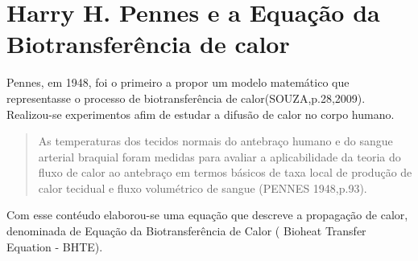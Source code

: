 \section{Harry H. Pennes e a Equação da Biotransferência de calor}


      
     Pennes, em 1948, foi o primeiro a propor um modelo matemático que representasse o processo de biotransferência de calor(SOUZA,p.28,2009).
     Realizou-se experimentos afim de estudar a difusão de calor no corpo humano.
      
      \begin{quotation}
      As temperaturas dos tecidos normais do antebraço humano e do sangue arterial braquial foram medidas para avaliar a aplicabilidade da teoria do fluxo de calor ao antebraço em termos básicos de taxa local de produção de calor tecidual e fluxo volumétrico de sangue (PENNES 1948,p.93). \end{quotation}

   Com esse contéudo elaborou-se uma equação que descreve a propagação de calor, denominada de Equação da Biotransferência de Calor ( Bioheat Transfer Equation - BHTE).


